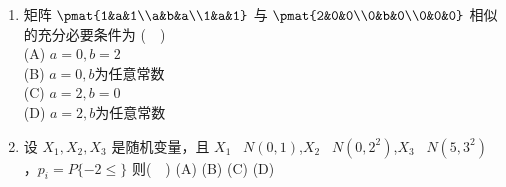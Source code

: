 \begin{enumerate}
\item  矩阵 $\pmat{1&a&1\\a&b&a\\1&a&1}$ 与 $\pmat{2&0&0\\0&b&0\\0&0&0}$ 相似的充分必要条件为 ($\quad$)\\
(A) $a=0,b=2$\\
(B) $a=0,b$为任意常数\\
(C) $a=2,b=0$\\
(D) $a=2,b$为任意常数
\item  设 $X_1,X_2,X_3$ 是随机变量，且 $X_1 $~ $N(0,1)$,$X_2 $~ $N(0,2^2)$,$X_3 $~ $N(5,3^2)$ ，$p_i=P\{-2 \le\}$ 则($\quad$)
(A) 
(B)
(C)
(D)
\end{enumerate}